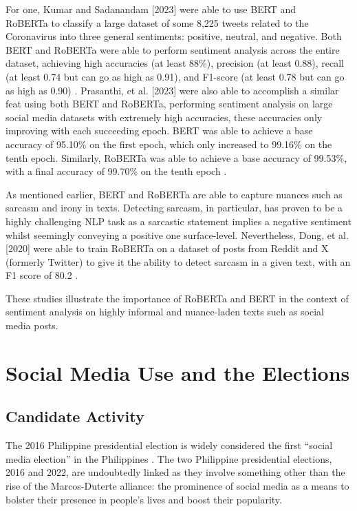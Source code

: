 For one, Kumar and Sadanandam [2023] were able to use BERT and\\RoBERTa to classify a large dataset of some 8,225 tweets related to the Coronavirus into three general sentiments: positive, neutral, and negative. Both BERT and RoBERTa were able to perform sentiment analysis across the entire dataset, achieving high accuracies (at least 88\%), precision (at least 0.88), recall (at least 0.74 but can go as high as 0.91), and F1-score (at least 0.78 but can go as high as 0.90) \cite{RRL_Pranay-Kumar-2023}. Prasanthi, et al. [2023] were also able to accomplish a similar feat using both BERT and RoBERTa, performing sentiment analysis on large social media datasets with extremely high accuracies, these accuracies only improving with each succeeding epoch. BERT was able to achieve a base accuracy of 95.10\% on the first epoch, which only increased to 99.16\% on the tenth epoch. Similarly, RoBERTa was able to achieve a base accuracy of 99.53\%, with a final accuracy of 99.70\% on the tenth epoch \cite{RRL_Prasanthi-2023}.

As mentioned earlier, BERT and RoBERTa are able to capture nuances such as sarcasm and irony in texts. Detecting sarcasm, in particular, has proven to be a highly challenging NLP task as a sarcastic statement implies a negative sentiment whilst seemingly conveying a positive one surface-level. Nevertheless, Dong, et al. [2020] were able to train RoBERTa on a dataset of posts from Reddit and X (formerly Twitter) to give it the ability to detect sarcasm in a given text, with an F1 score of 80.2 \cite{RRL_Dong-2020}.

These studies illustrate the importance of RoBERTa and BERT in the context of sentiment analysis on highly informal and nuance-laden texts such as social media posts.

\section{Social Media Use and the Elections}
\subsection{Candidate Activity}
The 2016 Philippine presidential election is widely considered the first “social media election” in the Philippines \cite{RRL_Sinpeng-2020}. The two Philippine presidential elections, 2016 and 2022, are undoubtedly linked as they involve something other than the rise of the Marcos-Duterte alliance: the prominence of social media as a means to bolster their presence in people’s lives and boost their popularity.

